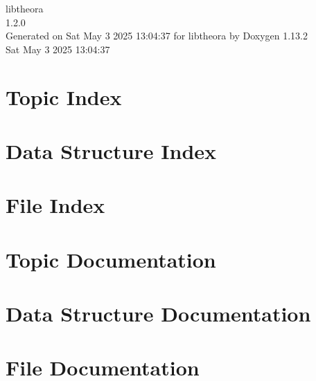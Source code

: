 \documentclass[twoside]{book}
\newcommand{\+}{\discretionary{\mbox{\scriptsize$\hookleftarrow$}}{}{}}
\newcommand{\clearemptydoublepage}{%
    \newpage{\pagestyle{empty}\cleardoublepage}%
  }
\begin{document}
  \raggedbottom
  \begin{titlepage}
  \vspace*{7cm}
  \begin{center}%
  {\Large libtheora}\\
  [1ex]\large 1.\+2.\+0 \\
  \vspace*{1cm}
  {\large Generated on Sat May 3 2025 13\+:04\+:37 for libtheora by Doxygen 1.13.2}\\
    \vspace*{0.5cm}
    {\small Sat May 3 2025 13:04:37}
  \end{center}
  \end{titlepage}
  \clearemptydoublepage
  \tableofcontents
  \clearemptydoublepage

\chapter{Topic Index}

\chapter{Data Structure Index}

\chapter{File Index}

\chapter{Topic Documentation}




\chapter{Data Structure Documentation}











\chapter{File Documentation}








  \backmatter
  \newpage
  \clearemptydoublepage
  \printindex
\end{document}
